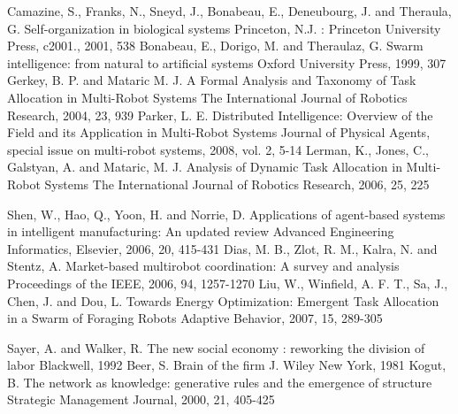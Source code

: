 \documentclass{llncs}
\begin{document}
\begin{thebibliography}{}

Camazine, S., Franks, N., Sneyd, J., Bonabeau, E., Deneubourg, J. and Theraula, G. Self-organization in biological systems Princeton, N.J. : Princeton University Press, c2001., 2001, 538
Bonabeau, E., Dorigo, M. and Theraulaz, G. Swarm intelligence: from natural to artificial systems Oxford University Press, 1999, 307
Gerkey, B. P. and Mataric  M. J. A Formal Analysis and Taxonomy of Task Allocation in Multi-Robot Systems The International Journal of Robotics Research, 2004, 23, 939
Parker, L. E. Distributed Intelligence: Overview of the Field and its Application in Multi-Robot Systems Journal of Physical Agents, special issue on multi-robot systems, 2008, vol. 2, 5-14
Lerman, K., Jones, C., Galstyan, A. and Mataric, M. J. Analysis of Dynamic Task Allocation in Multi-Robot Systems The International Journal of Robotics Research, 2006, 25, 225

Shen, W., Hao, Q., Yoon, H. and Norrie, D. Applications of agent-based systems in intelligent manufacturing: An updated review Advanced Engineering Informatics, Elsevier, 2006, 20, 415-431
Dias, M. B., Zlot, R. M., Kalra, N. and Stentz, A. Market-based multirobot coordination: A survey and analysis Proceedings of the IEEE, 2006, 94, 1257-1270
Liu, W., Winfield, A. F. T., Sa, J., Chen, J. and Dou, L. Towards Energy Optimization: Emergent Task Allocation in a Swarm of Foraging Robots Adaptive Behavior, 2007, 15, 289-305

Sayer, A. and Walker, R. The new social economy : reworking the division of labor Blackwell, 1992
Beer, S. Brain of the firm J. Wiley New York, 1981
Kogut, B. The network as knowledge: generative rules and the emergence of structure Strategic Management Journal, 2000, 21, 405-425


\end{thebibliography}
\end{document}
